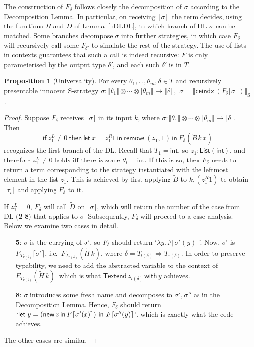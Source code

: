 \documentclass{CSML}
\theoremstyle{definition}\newtheorem{definition}[thm]{Definition}
\theoremstyle{definition}\newtheorem{example}[thm]{Example}
\theoremstyle{definition}\newtheorem{proposition}[thm]{Proposition}
\theoremstyle{definition}\newtheorem{lemma}[thm]{Lemma}
\theoremstyle{definition}\newtheorem{theorem}[thm]{Theorem}
\theoremstyle{definition}\newtheorem{corollary}[thm]{Corollary}
\theoremstyle{definition}\newtheorem{remark}[thm]{Remark}
\newcommand\arr{\rightarrow}
\newcommand\Arr{\Rightarrow}
\renewcommand\int{\mathsf{int}}
\newcommand\List[1]{\mathsf{List}(#1)}
\newcommand\remove[3]{\mathsf{remove}\ (#1,#2)\ \mathsf{in}\ #3}
\newcommand\deindx[1]{\mathsf{deindx}\ #1}
\newcommand\code[1]{\lceil#1\rceil}
\newcommand\letin[2]{\mathsf{let}\ #1\ \mathsf{in}\ #2}
\newcommand\sem[1]{\llbracket #1 \rrbracket}
\newcommand\ssem[1]{\sem{#1}_{\mathrm{S}}}
\newcommand\new[2]{\mathsf{new}\,#1\,\mathsf{in}\,#2}
\begin{document}
\noindent The construction of $F_\delta$ follows closely the decomposition of $\sigma$ according to 
the Decomposition Lemma. In particular, on receiving $\code{\sigma}$, the term decides,
using the functions $B$ and $D$ of Lemma~\ref{l:DLDL}, to which branch of DL 
$\sigma$ can be matched.
Some branches decompose $\sigma$ into further strategies,
in which case $F_\delta$ will recursively call some $F_{\delta'}$ to simulate the rest of the strategy.
The use of lists in contexts guarantees that such a call is indeed recursive: $F$ is only parameterised by the output type $\delta'$, and each such $\delta'$ is in $T$.
\begin{proposition}[Universality]\label{prop:univ}
For every $\theta_1,\dots,\theta_m,\delta\in T$ and recursively presentable innocent S-strategy $\sigma:\sem{\theta_1}\otimes\cdots\otimes\sem{\theta_m}\arr\sem{\delta}$\,,\,
$\sigma = \ssem{\deindx (F_\delta\code{\sigma})}$\,.
\end{proposition} 
\begin{proof}
Suppose $F_\delta$ receives $\code{\sigma}$ in its input $k$, where $\sigma:\sem{\theta_{1}}\otimes\cdots\otimes\sem{\theta_m}\arr\sem\delta$. Then
\[ 
\mathsf{if}\ z_{1}^L\neq0\ \mathsf{then}\
  \letin{x=z_1^R1}{\remove{z_1}{1}{F_\delta(\tilde{B}\,k\,x)}}
\]
recognizes the first branch of the DL. Recall that $T_1=\int$, so $z_1:\List{\int}$, and therefore $z_{1}^L\neq0$ holds iff there is some $\theta_i=\int$. If this is so, then $F_\delta$ needs to return a term corresponding to the strategy instantiated with the leftmost element in the list $z_1$.  This is achieved by first applying $\tilde B$ to $k,(z_1^R1)$ to obtain $\code{\tau_i}$ 
and applying $F_\delta$ to it.

If $z_1^L=0$,  $F_\delta$ will call $\tilde D$ on $\code{\sigma}$, 
which will return the number of the case from DL  ({\bf 2}-{\bf 8}) that applies to $\sigma$.
Subsequently, $F_\delta$ will proceed to a case analysis. Below we examine two cases in detail. 
\begin{enumerate}[label={\bf\arabic*}:]
\item[{\bf 5}:] $\sigma$ is the currying of  $\sigma'$, so $F_\delta$ should return 
`$\lambda y.\, F\code{\sigma'(y)}$'. Now, $\sigma'$ is $F_{T_{r(\delta)}}\code{\sigma'}$, i.e.\ $F_{T_{r(\delta)}}(\tilde H\, k)$, where $\delta=T_{l(\delta)}\Arr T_{r(\delta)}$. In order to preserve typability, we need to add the abstracted variable to the context of $F_{T_{r(\delta)}}(\tilde H\, k)$, which is what $\mathsf{Textend}\,z_{l(\delta)}\,\mathsf{with}\,y$ achieves.
\item[{\bf 8}:] $\sigma$ introduces some fresh name and decomposes to $\sigma',\sigma''$
as in the Decomposition Lemma. Hence,  $F_\delta$ should return $`\letin{y=(\new{x}{F\code{\sigma'(x)}})}{F\code{\sigma''(y)}}$', which is exactly what the code achieves.
\end{enumerate}
The other cases are similar.
\end{proof}
\end{document}
